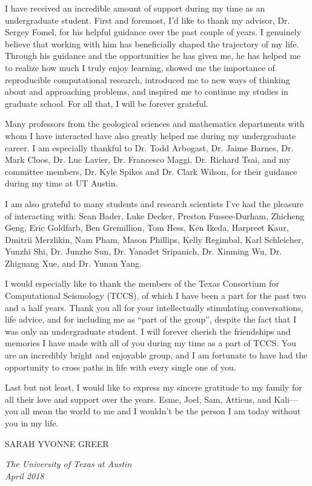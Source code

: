 I have received an incredible amount of support during my time as an undergraduate student. 
First and foremost, I'd like to thank my advisor, Dr. Sergey Fomel, for his helpful guidance over the past couple of years. 
I genuinely believe that working with him has beneficially shaped the trajectory of my life.
Through his guidance and the opportunities he has given me, he has helped me to realize how much I truly enjoy learning, showed me the importance of reproducible computational research, introduced me to new ways of thinking about and approaching problems, and inspired me to continue my studies in graduate school.
For all that, I will be forever grateful.

Many professors from the geological sciences and mathematics departments with whom I have interacted have also greatly helped me during my undergraduate career.  
I am especially thankful to Dr. Todd Arbogast, Dr. Jaime Barnes, Dr. Mark Cloos, Dr. Luc Lavier, Dr. Francesco Maggi, Dr. Richard Tsai, and my committee members, Dr. Kyle Spikes and Dr. Clark Wilson, for their guidance during my time at UT Austin.

I am also grateful to many students and research scientists I've had the pleasure of interacting with: 
Sean Bader, Luke Decker, Preston Fussee-Durham, Zhicheng Geng, Eric Goldfarb, Ben Gremillion, Tom Hess, Ken Ikeda, Harpreet Kaur, Dmitrii Merzlikin, Nam Pham, Mason Phillips, Kelly Regimbal, Karl Schleicher, Yunzhi Shi, Dr. Junzhe Sun, Dr. Yanadet Sripanich, Dr. Xinming Wu, Dr. Zhiguang Xue, and Dr. Yunan Yang. 

I would especially like to thank the members of the Texas Consortium for Computational Seismology (TCCS), of which I have been a part for the past two and a half years.
Thank you all for your intellectually stimulating conversations, life advice, and for including me as ``part of the group'', despite the fact that I was only an undergraduate student.
I will forever cherish the friendships and memories I have made with all of you during my time as a part of TCCS. 
You are an incredibly bright and enjoyable group, and I am fortunate to have had the opportunity to cross paths in life with every single one of you.


Last but not least, I would like to express my sincere gratitude to my family for all their love and support over the years.
Esme, Joel, Sam, Atticus, and Kali---you all mean the world to me and I wouldn't be the person I am today without you in my life.
\begin{flushright}
SARAH YVONNE GREER
\end{flushright}

\noindent \emph{The University of Texas at Austin}\\
\noindent \emph{April 2018} \\ \\

